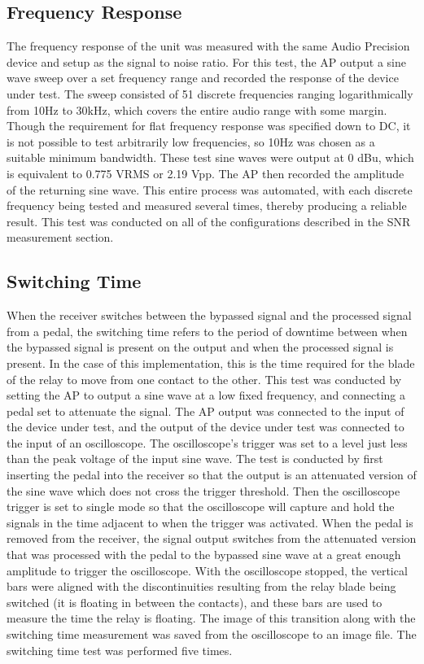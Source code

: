 \documentclass{article}
\begin{document}
	\subsection{Frequency Response}
	The frequency response of the unit was measured with the same Audio Precision device and setup as the signal to noise ratio.  For this test, the AP output a sine wave sweep over a set frequency range and recorded the response of the device under test.  The sweep consisted of 51 discrete frequencies ranging logarithmically from 10Hz to 30kHz, which covers the entire audio range with some margin.  Though the requirement for flat frequency response was specified down to DC, it is not possible to test arbitrarily low frequencies, so 10Hz was chosen as a suitable minimum bandwidth.  These test sine waves were output at 0 dBu, which is equivalent to 0.775 VRMS or 2.19 Vpp.  The AP then recorded the amplitude of the returning sine wave.  This entire process was automated, with each discrete frequency being tested and measured several times, thereby producing a reliable result.  This test was conducted on all of the configurations described in the SNR measurement section.  

	\subsection{Switching Time}
	When the receiver switches between the bypassed signal and the processed signal from a pedal, the switching time refers to the period of downtime between when the bypassed signal is present on the output and when the processed signal is present.  In the case of this implementation, this is the time required for the blade of the relay to move from one contact to the other.  This test was conducted by setting the AP to output a sine wave at a low fixed frequency, and connecting a pedal set to attenuate the signal.  The AP output was connected to the input of the device under test, and the output of the device under test was connected to the input of an oscilloscope.  The oscilloscope's trigger was set to a level just less than the peak voltage of the input sine wave.  The test is conducted by first inserting the pedal into the receiver so that the output is an attenuated version of the sine wave which does not cross the trigger threshold.  Then the oscilloscope trigger is set to single mode so that the oscilloscope will capture and hold the signals in the time adjacent to when the trigger was activated.  When the pedal is removed from the receiver, the signal output switches from the attenuated version that was processed with the pedal to the bypassed sine wave at a great enough amplitude to trigger the oscilloscope.  With the oscilloscope stopped, the vertical bars were aligned with the discontinuities resulting from the relay blade being switched (it is floating in between the contacts), and these bars are used to measure the time the relay is floating.  The image of this transition along with the switching time measurement was saved from the oscilloscope to an image file.  The switching time test was performed five times.
\end{document}
